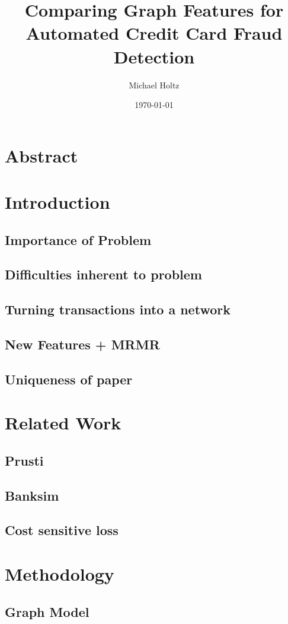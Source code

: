 \documentclass{article}
\title{Comparing Graph Features for Automated Credit Card Fraud Detection}
\author{Michael Holtz}
\date{\today}
\begin{document}
\maketitle

\section{Abstract}
\section{Introduction}
\subsection*{Importance of Problem}
\subsection*{Difficulties inherent to problem}
\subsection*{Turning transactions into a network}
\subsection*{New Features + MRMR}
\subsection*{Uniqueness of paper}

\section{Related Work}
\subsection*{Prusti}
\subsection*{Banksim}
\subsection*{Cost sensitive loss}

\section{Methodology}
\subsection*{Graph Model}
\end{document}
